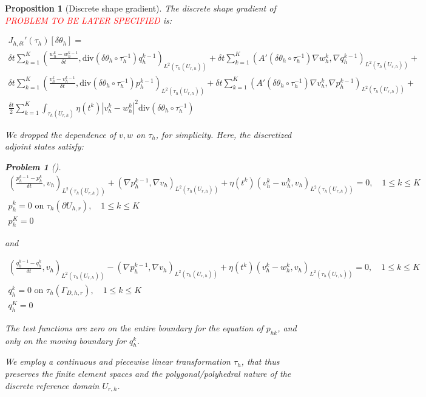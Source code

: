 \documentclass[english,a4paper,10pt,oneside]{scrbook}	%
\theoremstyle{break}
\newtheorem{prop}[equation]{Proposition}
\newtheorem{pb}[equation]{Problem}
\theoremstyle{remark}
\newcommand{\dive}{\text{div}}
\begin{document}
\begin{prop}[Discrete shape gradient]
\label{prop:discrete_shape_gradient}
The discrete shape gradient of \textcolor{red}{PROBLEM TO BE LATER SPECIFIED} is:

\begin{align*}
	J_{h,\delta t}'(\tau_h)[\delta \theta_h] =\\
	\delta t \sum_{k=1}^{K} \left (\frac{w_h^{k}-w_h^{k-1}}{\delta t}, \dive(\delta \theta_h \circ \tau_h^{-1}) q_h^{k-1} \right )_{L^2(\tau_h(U_{r,h}))} + \delta t \sum_{k=1}^{K} (A'(\delta \theta_h \circ \tau_h^{-1}) \nabla w_h^k, \nabla q_h^{k-1})_{L^2(\tau_h(U_{r,h}))}+\\
	\delta t \sum_{k=1}^{K} \left (\frac{v_h^{k}-v_h^{k-1}}{\delta t}, \dive(\delta \theta_h \circ \tau_h^{-1}) p_h^{k-1} \right )_{L^2(\tau_h(U_{r,h}))} + \delta t \sum_{k=1}^{K} (A'(\delta \theta_h \circ \tau_h^{-1}) \nabla v_h^k, \nabla p_h^{k-1})_{L^2(\tau_h(U_{r,h}))}+\\
	\frac{\delta t}{2} \sum_{k=1}^{K} \int_{\tau_h(U_{r,h})} \eta(t^k)|v_h^k-w_h^k|^2  \dive(\delta \theta_h \circ \tau_h^{-1})
\end{align*}

We dropped the dependence of $v,w$ on $\tau_h$, for simplicity. Here, the discretized adjoint states satisfy:

\begin{pb}[]

\begin{align*}
	\left ( \frac{p_h^{k-1}-p_h^k}{\delta t}, v_h\right )_{L^2(\tau_h(U_{r,h}))} + (\nabla p_h^{k-1}, \nabla v_h )_{L^2(\tau_h(U_{r,h}))} + \eta(t^k)(v_h^k-w_h^k,v_h)_{L^2(\tau_h(U_{r,h}))} = 0, \quad 1\leq k \leq K\\
	p_h^k = 0 \text{ on }  \tau_h (\partial U_{h,r}), \quad 1\leq k \leq K\\
	p_h^K=0 
\end{align*}

and 

\begin{align*}
	\left ( \frac{q_h^{k-1}-q_h^k}{\delta t}, v_h\right )_{L^2(\tau_h(U_{r,h}))} - (\nabla p_h^{k-1}, \nabla v_h )_{L^2(\tau_h(U_{r,h}))} + \eta(t^k)(v_h^k-w_h^k,v_h)_{L^2(\tau_h(U_{r,h}))} = 0, \quad 1\leq k \leq K\\
	q_h^k = 0 \text{ on } \tau_h (\Gamma_{D,h,r}), \quad 1\leq k \leq K\\
	q_h^K=0 
\end{align*}

The test functions are zero on the entire boundary for the equation of $p_{hk}$, and only on the moving boundary for $q_h^k$.

\end{pb}

We employ a continuous and piecewise linear transformation $\tau_h$, that thus preserves the finite element spaces and the polygonal/polyhedral nature of the discrete reference domain $U_{r,h}$.

\end{prop}
\end{document}
